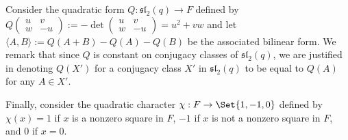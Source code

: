 \documentclass[preprint,11pt]{amsart}
\theoremstyle{definition}
\numberwithin{thm}{section}
\def\sl{\mathfrak{sl}}
\newcommand{\ip}[1]{\langle #1 \rangle}
\begin{document}
Consider the quadratic form $Q : \sl_2(q) \to F$ defined by $Q \begin{pmatrix} u & v \\ w & - u \end{pmatrix} := - \det \begin{pmatrix} u & v \\ w & - u \end{pmatrix} = u^2 + vw$ and let $\ip{A,B} := Q(A+B) - Q(A) - Q(B)$ be the associated bilinear form. We remark that since $Q$ is constant on conjugacy classes of $\sl_2(q)$,  we are justified in denoting $Q(X')$ for a conjugacy class $X'$ in $\sl_2(q)$ to be equal to $Q(A)$ for any $A \in X'$.

 Finally, consider  the quadratic character $\chi: F \to \Set{1, -1, 0}$ defined by $\chi(x) = 1$ if $x$ is a nonzero square in $F$, $-1$ if  $x$ is not a nonzero square in $F$, and $0$ if $x = 0$. 
\end{document}
